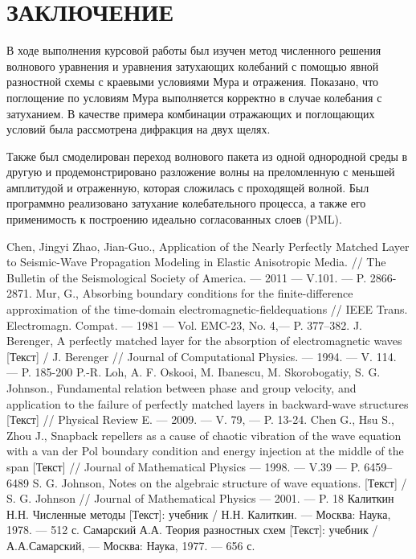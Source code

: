 \documentclass[a4paper, fontsize=14pt]{article}
\begin{document}
\newpage
\section*{ЗАКЛЮЧЕНИЕ}
В ходе выполнения курсовой работы был изучен метод численного решения волнового уравнения и уравнения затухающих колебаний
с помощью явной разностной схемы с краевыми условиями Мура и отражения. Показано, что поглощение по условиям Мура 
выполняется корректно в случае колебания с затуханием. В качестве примера комбинации отражающих и поглощающих условий была рассмотрена дифракция на двух щелях.

Также был смоделирован переход волнового пакета из одной однородной среды в другую и продемонстрировано разложение волны на преломленную
с меньшей амплитудой и отраженную, которая сложилась с проходящей волной. Был программно реализовано затухание колебательного процесса, 
а также его применимость к построению идеально согласованных слоев (PML).

\newpage

\begin{thebibliography}{9}
  Chen, Jingyi Zhao, Jian-Guo.,
  Application of the Nearly Perfectly Matched Layer to Seismic-Wave Propagation Modeling in Elastic Anisotropic Media. //
  The Bulletin of the Seismological Society of America. — 2011 — V.101. — P. 2866-2871.
  Mur, G., Absorbing boundary conditions for the finite-difference approximation of the time-domain electromagnetic-fieldequations //
   IEEE Trans. Electromagn. Compat. — 1981 — Vol. EMC-23, No. 4,— P. 377–382.
  J. Berenger, A perfectly matched layer for the absorption of electromagnetic waves [Текст] / J. Berenger //
  Journal of Computational Physics. — 1994. — V. 114. — P. 185-200
  P.-R. Loh, A. F. Oskooi, M. Ibanescu, M. Skorobogatiy, S. G. Johnson.,
  Fundamental relation between phase and group velocity, and application
  to the failure of perfectly matched layers in backward-wave structures [Текст] //
  Physical Review E. — 2009. — V. 79, — P. 13-24.
  Chen G., Hsu S., Zhou J., Snapback repellers as a cause of chaotic vibration of the wave equation
  with a van der Pol boundary condition and energy injection at the middle of the span [Текст] // Journal of
  Mathematical Physics — 1998. — V.39 — P. 6459–6489
  S. G. Johnson, Notes on the algebraic structure of wave equations. [Текст] /  S. G. Johnson // Journal of Mathematical Physics — 2001. — P. 18
  Калиткин Н.Н. Численные методы [Текст]: учебник / Н.Н. Калиткин. — Москва: Наука, 1978. — 512 с.
  Самарский А.А. Теория разностных схем [Текст]: учебник / А.А.Самарский, — Москва: Наука, 1977. — 656 с.
  \end{thebibliography}

\end{document}
